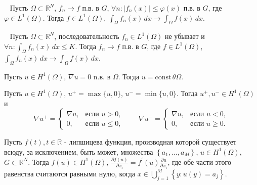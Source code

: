 \begin{theorem}[Лебег]
    \label{th:lebeg}~\cite[321]{Kolmogorov2004}
    Пусть $\Omega \subset \mathbb{R}^N$, $f_n \to f$ п.в. в $G$,
    $\forall n : |f_n(x)| \leq \varphi(x)$ п.в. в $G$,
    где $\varphi \in L^1(\Omega)$.
    Тогда $f \in L^1(\Omega)$, $\int_{\Omega} f_n(x) \, dx \to \int_{\Omega} f(x) \, dx$.
\end{theorem}

\begin{theorem}[Леви]
    \label{th:levi}~\cite[322]{Kolmogorov2004}
    Пусть $\Omega \subset \mathbb{R}^N$, последовательность $f_n \in L^1(\Omega)$
    не убывает и $\forall n : \int_{\Omega} f_n(x) \, dx \leq K$.
    Тогда $f_n \to f$ п.в. в $G$, где $f \in L^1(\Omega)$,
    $\int_{\Omega} f_n(x) \, dx \to \int_{\Omega} f(x) \, dx$.
\end{theorem}

\begin{lemma}
    \label{lm:1_5:15}\cite[47]{Ziemer1989}
    Пусть $u \in H^{1}(\Omega)$, $\nabla u = 0$ n.в. в $\Omega$.
    Тогда $u = \text{const}\, \theta \Omega$.
\end{lemma}

\begin{lemma}
    \label{lm:1_5:16}\cite[47]{Kinderlehrer1983}
    Пусть $u \in H^{1}(\Omega)$, $u^{+} = \max \{u, 0\}$,
    $u^{-} = \min \{u, 0\}$.
    Тогда $u^{+}, u^{-} \in H^{1}(\Omega)$ и
    \[
        \nabla u^{+} =
        \begin{cases}
            \nabla u, & \text{если } u > 0, \\
            0, & \text{если } u \leq 0,
        \end{cases}
        \qquad
        \nabla u^{-} =
        \begin{cases}
            \nabla u, & \text{если } u < 0, \\
            0, & \text{если } u \geq 0.
        \end{cases}
    \]
\end{lemma}

\begin{lemma}
    \label{lm:1_5:lipshitz}\cite[50]{Kinderlehrer1983}
    Пусть $f(t), t \in \mathbb{R}$ - липшицева функция,
    производная которой существует всюду, за исключением,
    быть может, множества $\left\{a_{1}, \ldots, a_{M}\right\}$,
    $u \in H^{1}(\Omega)$, $G \subset \mathbb{R}^{N}$.
    Тогда $f(u) \in H^{1}(\Omega)$,
    $\frac{\partial f(u)}{\partial x_{i}} = f^{\prime}(u)
    \frac{\partial u}{\partial x_{i}}$,
    где обе части этого равенства считаются равными нулю,
    когда $x \in \bigcup_{j=1}^{M}\left\{y: u(y)=a_{j}\right\}$.
\end{lemma}

